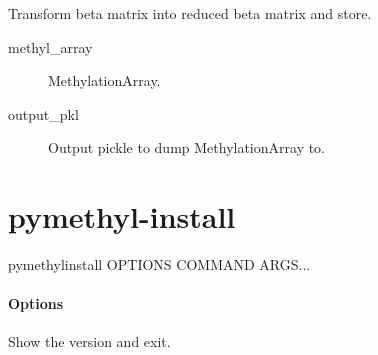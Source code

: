 \documentclass[letterpaper,10pt,english]{sphinxmanual}
\begin{document}
\begin{fulllineitems}

\begin{fulllineitems}
\label{\detokenize{index:pymethylprocess.general_machine_learning.MachineLearning.transform_results_to_beta}}
Transform beta matrix into reduced beta matrix and store.
\begin{description}
\item[{methyl\_array}] \leavevmode
MethylationArray.

\item[{output\_pkl}] \leavevmode
Output pickle to dump MethylationArray to.

\end{description}

\end{fulllineitems}


\end{fulllineitems}



\chapter{pymethyl-install}
\label{\detokenize{index:pymethyl-install}}
\begin{sphinxVerbatim}[commandchars=\\\{\}]
pymethyl\PYGZhy{}install \PYG{o}{[}OPTIONS\PYG{o}{]} COMMAND \PYG{o}{[}ARGS\PYG{o}{]}...
\end{sphinxVerbatim}
\subsubsection*{Options}

\begin{fulllineitems}
\label{\detokenize{index:cmdoption-pymethyl-install-version}}
Show the version and exit.

\end{fulllineitems}
\end{document}
